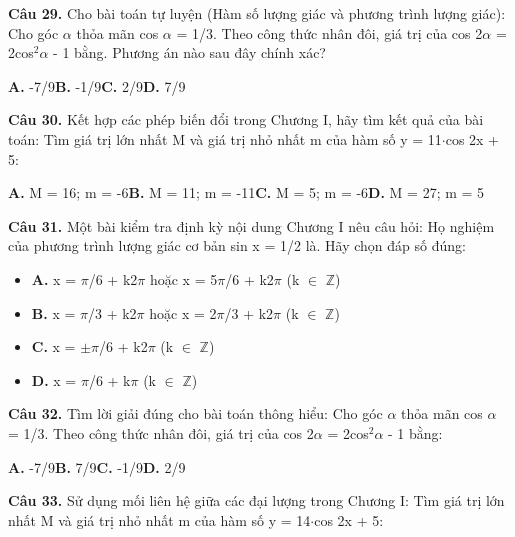 \documentclass[11pt,a4paper]{article}
\begin{document}
\textbf{\color{primary} Câu 29.} Cho bài toán tự luyện (Hàm số lượng giác và phương trình lượng giác): Cho góc $\alpha$ thỏa mãn cos $\alpha$ = 1/3. Theo công thức nhân đôi, giá trị của cos 2$\alpha$ = 2cos$^2$$\alpha$ - 1 bằng. Phương án nào sau đây chính xác?\par
\hspace*{1.5em}\textbf{A.} -7/9\quad\quad \textbf{B.} -1/9\quad\quad \textbf{C.} 2/9\quad\quad \textbf{D.} 7/9\par\vspace{2pt}
\textbf{\color{primary} Câu 30.} Kết hợp các phép biến đổi trong Chương I, hãy tìm kết quả của bài toán: Tìm giá trị lớn nhất M và giá trị nhỏ nhất m của hàm số y = 11$\cdot$cos 2x + 5:\par
\hspace*{1.5em}\textbf{A.} M = 16; m = -6\quad\quad \textbf{B.} M = 11; m = -11\quad\quad \textbf{C.} M = 5; m = -6\quad\quad \textbf{D.} M = 27; m = 5\par\vspace{2pt}
\textbf{\color{primary} Câu 31.} Một bài kiểm tra định kỳ nội dung Chương I nêu câu hỏi: Họ nghiệm của phương trình lượng giác cơ bản sin x = 1/2 là. Hãy chọn đáp số đúng:\par
\begin{itemize}\setlength{\itemsep}{1pt}\setlength{\parskip}{0pt}
  \item[] \textbf{A.} x = $\pi$/6 + k2$\pi$ hoặc x = 5$\pi$/6 + k2$\pi$ (k $\in$ $\mathbb{Z}$)
  \item[] \textbf{B.} x = $\pi$/3 + k2$\pi$ hoặc x = 2$\pi$/3 + k2$\pi$ (k $\in$ $\mathbb{Z}$)
  \item[] \textbf{C.} x = $\pm$$\pi$/6 + k2$\pi$ (k $\in$ $\mathbb{Z}$)
  \item[] \textbf{D.} x = $\pi$/6 + k$\pi$ (k $\in$ $\mathbb{Z}$)
\end{itemize}\vspace{2pt}
\textbf{\color{primary} Câu 32.} Tìm lời giải đúng cho bài toán thông hiểu: Cho góc $\alpha$ thỏa mãn cos $\alpha$ = 1/3. Theo công thức nhân đôi, giá trị của cos 2$\alpha$ = 2cos$^2$$\alpha$ - 1 bằng:\par
\hspace*{1.5em}\textbf{A.} -7/9\quad\quad \textbf{B.} 7/9\quad\quad \textbf{C.} -1/9\quad\quad \textbf{D.} 2/9\par\vspace{2pt}
\textbf{\color{primary} Câu 33.} Sử dụng mối liên hệ giữa các đại lượng trong Chương I: Tìm giá trị lớn nhất M và giá trị nhỏ nhất m của hàm số y = 14$\cdot$cos 2x + 5:\par
\end{document}
